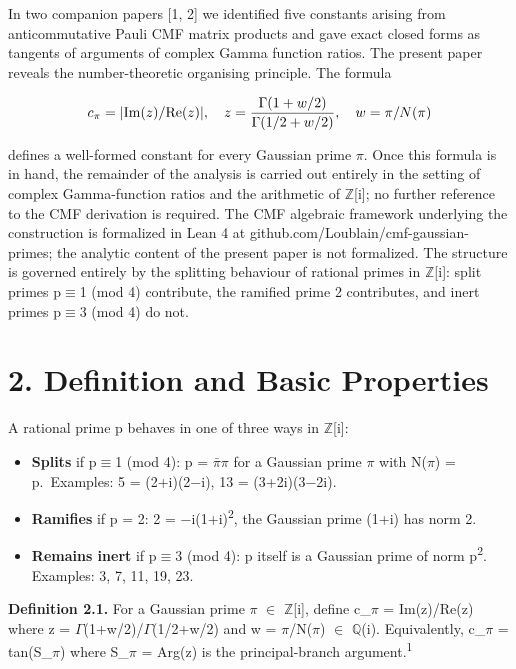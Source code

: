 \documentclass[11pt]{article}
\providecommand{\tightlist}{\setlength{\itemsep}{0pt}\setlength{\parskip}{0pt}}
\begin{document}
In two companion papers {[}1, 2{]} we identified five constants arising
from anticommutative Pauli CMF matrix products and gave exact closed
forms as tangents of arguments of complex Gamma function ratios. The
present paper reveals the number-theoretic organising principle. The
formula

\[c_\pi = |{\rm Im}(z)/{\rm Re}(z)|, \quad z = \frac{\Gamma(1+w/2)}{\Gamma(1/2+w/2)}, \quad w = \pi/N(\pi)\]

defines a well-formed constant for every Gaussian prime \(\pi\). Once
this formula is in hand, the remainder of the analysis is carried out
entirely in the setting of complex Gamma-function ratios and the
arithmetic of \(\mathbb{Z}\){[}i{]}; no further reference to the CMF
derivation is required. The CMF algebraic framework underlying the
construction is formalized in Lean 4 at
github.com/Loublain/cmf-gaussian-primes; the analytic content of the
present paper is not formalized. The structure is governed entirely by
the splitting behaviour of rational primes in \(\mathbb{Z}\){[}i{]}:
split primes p\(\equiv\)1 (mod 4) contribute, the ramified prime 2
contributes, and inert primes p\(\equiv\)3 (mod 4) do not.

\hypertarget{definition-and-basic-properties}{%
\section{2. Definition and Basic
Properties}\label{definition-and-basic-properties}}

A rational prime p behaves in one of three ways in
\(\mathbb{Z}\){[}i{]}:

\begin{itemize}
\tightlist
\item
  \textbf{Splits} if p\(\equiv\)1 (mod 4): p = \(\bar{\pi}\pi\) for a
  Gaussian prime \(\pi\) with N(\(\pi\)) = p.~Examples: 5 = (2+i)(2−i),
  13 = (3+2i)(3−2i).
\item
  \textbf{Ramifies} if p = 2: 2 = −i(1+i)\textsuperscript{2}, the
  Gaussian prime (1+i) has norm 2.
\item
  \textbf{Remains inert} if p\(\equiv\)3 (mod 4): p itself is a Gaussian
  prime of norm p\textsuperscript{2}. Examples: 3, 7, 11, 19, 23.
\end{itemize}

\textbf{Definition 2.1.} For a Gaussian prime \(\pi\) \(\in\)
\(\mathbb{Z}\){[}i{]}, define c\_\(\pi\) =
\textbar Im(z)/Re(z)\textbar{} where z =
\(\Gamma\)(1+w/2)/\(\Gamma\)(1/2+w/2) and w = \(\pi\)/N(\(\pi\)) \(\in\)
\(\mathbb{Q}\)(i). Equivalently, c\_\(\pi\) =
\textbar tan(S\_\(\pi\))\textbar{} where S\_\(\pi\) = Arg(z) is the
principal-branch argument.\textsuperscript{1}
\end{document}
